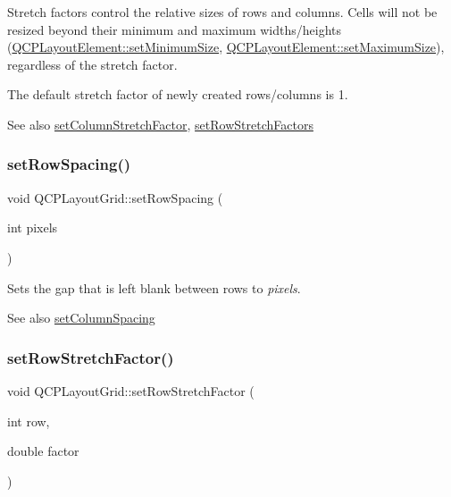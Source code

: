 Stretch factors control the relative sizes of rows and columns. Cells will not be resized beyond their minimum and maximum widths/heights (\hyperlink{class_q_c_p_layout_element_a5dd29a3c8bc88440c97c06b67be7886b}{Q\+C\+P\+Layout\+Element\+::set\+Minimum\+Size}, \hyperlink{class_q_c_p_layout_element_a74eb5280a737ab44833d506db65efd95}{Q\+C\+P\+Layout\+Element\+::set\+Maximum\+Size}), regardless of the stretch factor.

The default stretch factor of newly created rows/columns is 1.

\begin{DoxySeeAlso}{See also}
\hyperlink{class_q_c_p_layout_grid_ae38f31a71687b9d7ee3104852528fb50}{set\+Column\+Stretch\+Factor}, \hyperlink{class_q_c_p_layout_grid_a200b45f9c908f96ebadaa3c8d87a2782}{set\+Row\+Stretch\+Factors} 
\end{DoxySeeAlso}
\hypertarget{class_q_c_p_layout_grid_aaef2cd2d456197ee06a208793678e436}{}\label{class_q_c_p_layout_grid_aaef2cd2d456197ee06a208793678e436} 
\subsubsection{\texorpdfstring{set\+Row\+Spacing()}{setRowSpacing()}}
{\footnotesize\ttfamily void Q\+C\+P\+Layout\+Grid\+::set\+Row\+Spacing (\begin{DoxyParamCaption}\item[{int}]{pixels }\end{DoxyParamCaption})}

Sets the gap that is left blank between rows to {\itshape pixels}.

\begin{DoxySeeAlso}{See also}
\hyperlink{class_q_c_p_layout_grid_a3a49272aba32bb0fddc3bb2a45a3dba0}{set\+Column\+Spacing} 
\end{DoxySeeAlso}
\hypertarget{class_q_c_p_layout_grid_a7b0273de5369bd93d942edbaf5b166ec}{}\label{class_q_c_p_layout_grid_a7b0273de5369bd93d942edbaf5b166ec} 
\subsubsection{\texorpdfstring{set\+Row\+Stretch\+Factor()}{setRowStretchFactor()}}
{\footnotesize\ttfamily void Q\+C\+P\+Layout\+Grid\+::set\+Row\+Stretch\+Factor (\begin{DoxyParamCaption}\item[{int}]{row,  }\item[{double}]{factor }\end{DoxyParamCaption})}

